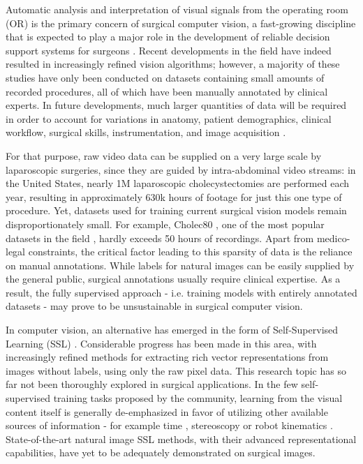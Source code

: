 \documentclass[times,twocolumn,final]{elsarticle}
\begin{document}
Automatic analysis and interpretation of visual signals from the operating room (OR) is the primary concern of surgical computer vision, a fast-growing discipline that is expected to play a major role in the development of reliable decision support systems for surgeons \citep{sds}. Recent developments in the field have indeed resulted in increasingly refined vision algorithms; however, a majority of these studies have only been conducted on datasets containing small amounts of recorded procedures, all of which have been manually annotated by clinical experts. In future developments, much larger quantities of data will be required in order to account for variations in anatomy, patient demographics, clinical workflow, surgical skills, instrumentation, and image acquisition \citep{sds_2}.

For that purpose, raw video data can be supplied on a very large scale by laparoscopic surgeries, since they are guided by intra-abdominal video streams: in the United States, nearly 1M laparoscopic cholecystectomies are performed each year, resulting in approximately 630k hours of footage for just this one type of procedure. Yet, datasets used for training current surgical vision models remain disproportionately small. For example, Cholec80 \citep{twinanda2016endonet}, one of the most popular datasets in the field \citep{sds}, hardly exceeds 50 hours of recordings. Apart from medico-legal constraints, the critical factor leading to this sparsity of data is the reliance on manual annotations. While labels for natural images can be easily supplied by the general public, surgical annotations usually require clinical expertise. As a result, the fully supervised approach - i.e. training models with entirely annotated datasets - may prove to be unsustainable in surgical computer vision.

In computer vision, an alternative has emerged in the form of Self-Supervised Learning (SSL) \citep{ssl_survey}. Considerable progress has been made in this area, with increasingly refined methods for extracting rich vector representations from images without labels, using only the raw pixel data. This research topic has so far not been thoroughly explored in surgical applications. In the few self-supervised training tasks proposed by the community, learning from the visual content itself is generally de-emphasized in favor of utilizing other available sources of information - for example time \citep{funke2018temporal, yengera2018less}, stereoscopy \citep{yang2021real} or robot kinematics \citep{sestini2021kinematic}. State-of-the-art natural image SSL methods, with their advanced representational capabilities, have yet to be adequately demonstrated on surgical images.
\end{document}

